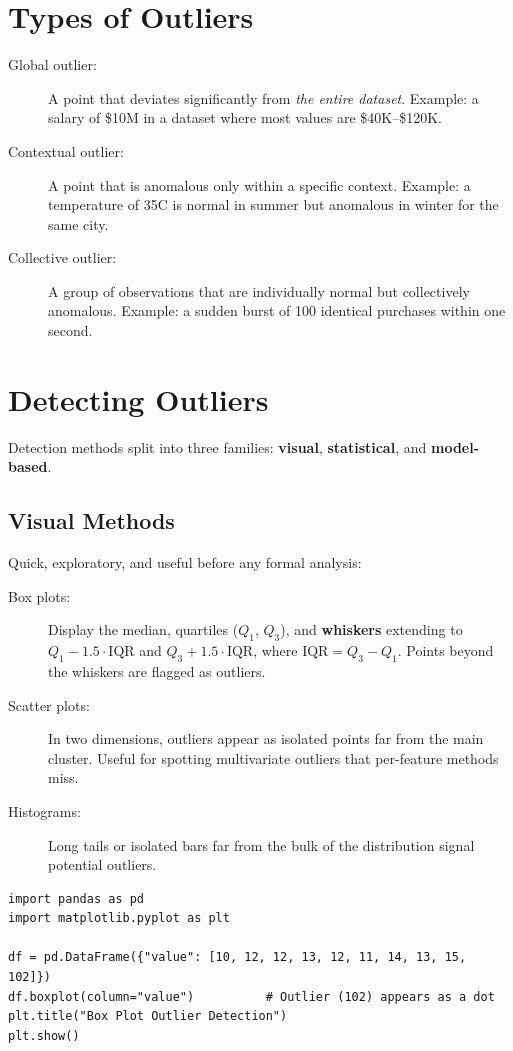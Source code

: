 \section*{Types of Outliers}

\begin{description}
    \item[Global outlier:] A point that deviates significantly from \textit{the entire dataset}. Example: a salary of \$10M in a dataset where most values are \$40K--\$120K.
    \item[Contextual outlier:] A point that is anomalous only within a specific context. Example: a temperature of 35\textdegree C is normal in summer but anomalous in winter for the same city.
    \item[Collective outlier:] A group of observations that are individually normal but collectively anomalous. Example: a sudden burst of 100 identical purchases within one second.
\end{description}


\section*{Detecting Outliers}

Detection methods split into three families: \textbf{visual}, \textbf{statistical}, and \textbf{model-based}.

\subsection*{Visual Methods}

Quick, exploratory, and useful before any formal analysis:

\begin{description}
    \item[Box plots:] Display the median, quartiles ($Q_1$, $Q_3$), and \textbf{whiskers} extending to $Q_1 - 1.5 \cdot \text{IQR}$ and $Q_3 + 1.5 \cdot \text{IQR}$, where $\text{IQR} = Q_3 - Q_1$. Points beyond the whiskers are flagged as outliers.
    \item[Scatter plots:] In two dimensions, outliers appear as isolated points far from the main cluster. Useful for spotting multivariate outliers that per-feature methods miss.
    \item[Histograms:] Long tails or isolated bars far from the bulk of the distribution signal potential outliers.
\end{description}

\begin{lstlisting}[style=pythonstyle]
import pandas as pd
import matplotlib.pyplot as plt

df = pd.DataFrame({"value": [10, 12, 12, 13, 12, 11, 14, 13, 15, 102]})
df.boxplot(column="value")          # Outlier (102) appears as a dot
plt.title("Box Plot Outlier Detection")
plt.show()
\end{lstlisting}


